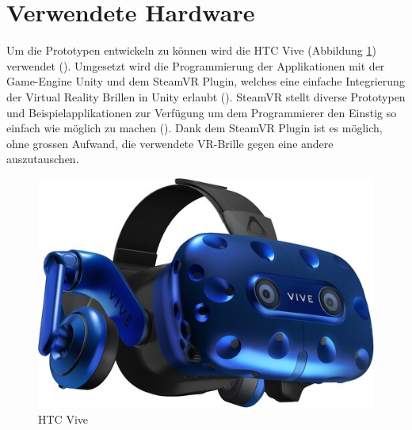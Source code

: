 \section{Verwendete Hardware}
Um die Prototypen entwickeln zu können wird die HTC Vive (Abbildung \ref{fig:htc_vive}) verwendet (\cite{noauthor_vive_2019}). Umgesetzt wird die Programmierung der Applikationen mit der Game-Engine Unity und dem SteamVR Plugin, welches eine einfache Integrierung der Virtual Reality Brillen in Unity erlaubt (\cite{noauthor_unity_2019}). SteamVR stellt diverse Prototypen und Beispielapplikationen zur Verfügung um dem Programmierer den Einstig so einfach wie möglich zu machen (\cite{noauthor_steamvr_2019}). Dank dem SteamVR Plugin ist es möglich, ohne grossen Aufwand, die verwendete VR-Brille gegen eine andere auszutauschen.

\begin{figure}[h!]
	\centering
	\includegraphics[keepaspectratio,width=0.29\linewidth]{img/Vive_Pro.jpg}
	\caption{HTC Vive}
	\label{fig:htc_vive}
\end{figure}